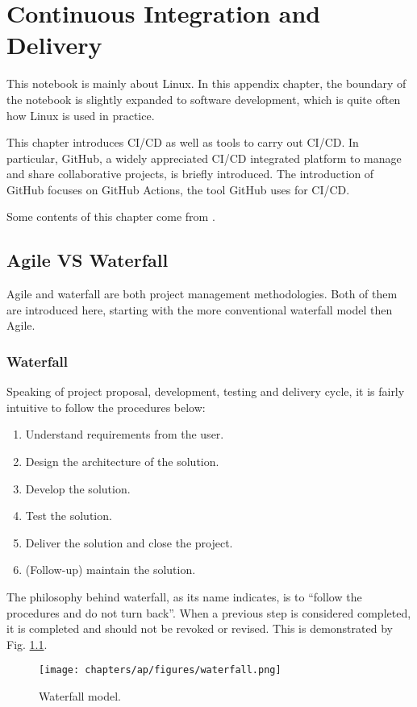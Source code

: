 \chapter{Continuous Integration and Delivery} \label{ch:cicd}

This notebook is mainly about Linux. In this appendix chapter, the boundary of the notebook is slightly expanded to software development, which is quite often how Linux is used in practice.

This chapter introduces CI/CD as well as tools to carry out CI/CD. In particular, GitHub, a widely appreciated CI/CD integrated platform to manage and share collaborative projects, is briefly introduced. The introduction of GitHub focuses on GitHub Actions, the tool GitHub uses for CI/CD.

Some contents of this chapter come from \cite{honai2023cicd}.

\section{Agile VS Waterfall}

Agile and waterfall are both project management methodologies. Both of them are introduced here, starting with the more conventional waterfall model then Agile.

\subsection{Waterfall}

Speaking of project proposal, development, testing and delivery cycle, it is fairly intuitive to follow the procedures below:
\begin{enumerate}
	\item Understand requirements from the user.
	\item Design the architecture of the solution.
	\item Develop the solution.
	\item Test the solution.
	\item Deliver the solution and close the project.
	\item (Follow-up) maintain the solution.
\end{enumerate}
The philosophy behind waterfall, as its name indicates, is to ``follow the procedures and do not turn back''. When a previous step is considered completed, it is completed and should not be revoked or revised. This is demonstrated by Fig. \ref{ch:cicd:fig:waterfall}.
\begin{figure}[htbp]
	\centering
	\texttt{[image: chapters/ap/figures/waterfall.png]}
	\caption{Waterfall model.} \label{ch:cicd:fig:waterfall}
\end{figure}

